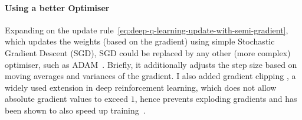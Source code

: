 \paragraph{Using a better Optimiser}


Expanding on the update rule~\eqref{eq:deep-q-learning-update-with-semi-gradient}, which updates the weights (based on the gradient) using simple Stochastic Gradient Descent (SGD), SGD could be replaced by any other (more complex) optimiser, such as ADAM~\cite{kingma2015adamoptimiser}. Briefly, it additionally adjusts the step size based on moving averages and variances of the gradient. I also added gradient clipping \cite{mikolov2012gradientclippingoriginal}, a widely used extension in deep reinforcement learning, which does not allow absolute gradient values to exceed $1$, hence prevents exploding gradients and has been shown to also speed up training~\cite{zhang2020gradientclippingaccelerate}.

